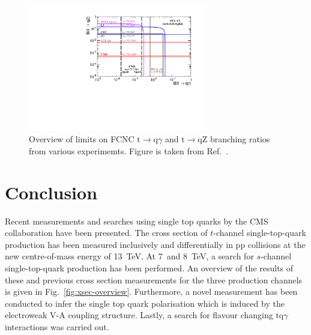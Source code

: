 \documentclass{PoS}
\begin{document}
\begin{figure}[htbp]
\begin{center}
\includegraphics[width=0.7\textwidth]{figures/limits.pdf}
\caption{\label{fig:FCNClimit}Overview of limits on FCNC $\mathrm{t}\to\mathrm{q}\gamma$ and $\mathrm{t}\to\mathrm{qZ}$ branching ratios from various experimemts. Figure is taken from Ref.~\cite{CMS-PAS-TOP-14-003}.}
\end{center}
\end{figure}



\section{Conclusion}

Recent measurements and searches using single top quarks by the CMS collaboration have been presented. The cross section of $t$-channel single-top-quark production has been measured inclusively and differentially in pp collisions at the new centre-of-mass energy of 13~TeV. At 7~and 8~TeV, a search for $s$-channel single-top-quark production has been performed. An overview of the results of these and previous cross section measurements for the three production channels is given in Fig.~\ref{fig:xsec-overview}. Furthermore, a novel measurement has been conducted to infer the single top quark polarisation which is induced by the electroweak V-A coupling structure. Lastly, a search for flavour changing $\mathrm{tq}\gamma$ interactions was carried out.
\end{document}
